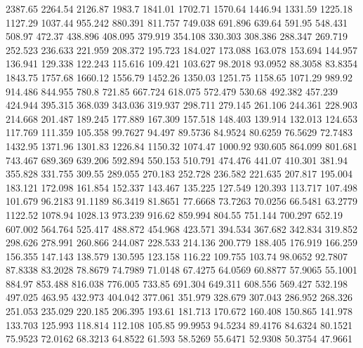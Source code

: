 2387.65      2264.54      2126.87      1983.7      1841.01      1702.71      1570.64      1446.94      1331.59      1225.18      1127.29      1037.44      955.242      880.391      811.757      749.038      691.896      639.64      591.95      548.431      508.97      472.37      438.896      408.095      379.919      354.108      330.303      308.386      288.347      269.719      252.523      236.633      221.959      208.372      195.723      184.027      173.088      163.078      153.694      144.957      136.941      129.338      122.243      115.616      109.421      103.627      98.2018      93.0952      88.3058      83.8354      
1843.75      1757.68      1660.12      1556.79      1452.26      1350.03      1251.75      1158.65      1071.29      989.92      914.486      844.955      780.8      721.85      667.724      618.075      572.479      530.68      492.382      457.239      424.944      395.315      368.039      343.036      319.937      298.711      279.145      261.106      244.361      228.903      214.668      201.487      189.245      177.889      167.309      157.518      148.403      139.914      132.013      124.653      117.769      111.359      105.358      99.7627      94.497      89.5736      84.9524      80.6259      76.5629      72.7483      
1432.95      1371.96      1301.83      1226.84      1150.32      1074.47      1000.92      930.605      864.099      801.681      743.467      689.369      639.206      592.894      550.153      510.791      474.476      441.07      410.301      381.94      355.828      331.755      309.55      289.055      270.183      252.728      236.582      221.635      207.817      195.004      183.121      172.098      161.854      152.337      143.467      135.225      127.549      120.393      113.717      107.498      101.679      96.2183      91.1189      86.3419      81.8651      77.6668      73.7263      70.0256      66.5481      63.2779      
1122.52      1078.94      1028.13      973.239      916.62      859.994      804.55      751.144      700.297      652.19      607.002      564.764      525.417      488.872      454.968      423.571      394.534      367.682      342.834      319.852      298.626      278.991      260.866      244.087      228.533      214.136      200.779      188.405      176.919      166.259      156.355      147.143      138.579      130.595      123.158      116.22      109.755      103.74      98.0652      92.7807      87.8338      83.2028      78.8679      74.7989      71.0148      67.4275      64.0569      60.8877      57.9065      55.1001      
884.97      853.488      816.038      776.005      733.85      691.304      649.311      608.556      569.427      532.198      497.025      463.95      432.973      404.042      377.061      351.979      328.679      307.043      286.952      268.326      251.053      235.029      220.185      206.395      193.61      181.713      170.672      160.408      150.865      141.978      133.703      125.993      118.814      112.108      105.85      99.9953      94.5234      89.4176      84.6324      80.1521      75.9523      72.0162      68.3213      64.8522      61.593      58.5269      55.6471      52.9308      50.3754      47.9661      
